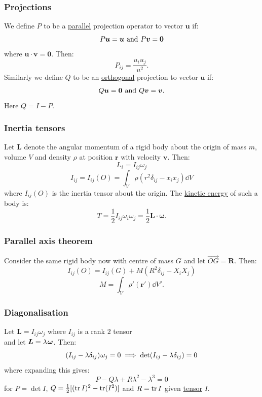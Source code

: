 \documentclass{article}
\newcommand{\vc}[1]{\boldsymbol{#1}}
\begin{document}
\begin{multicols*}{3}
\subsubsection*{Projections}
We define $P$ to be a \underline{parallel}
projection operator to vector $\boldsymbol{u}$ if:
$$P\boldsymbol{u}=\boldsymbol{u}
\hspace{0.05in}\text{and}\hspace{0.05in}
P\boldsymbol{v}=\boldsymbol{0}$$
where $\boldsymbol{u}\cdot\boldsymbol{v}=\boldsymbol{0}$.
Then:
$$P_{ij}=\frac{u_i u_j}{u^2}.$$
Similarly we define $Q$ to be an \underline{orthogonal} projection
to vector $\boldsymbol{u}$ if:
$$Q\boldsymbol{u}=\boldsymbol{0}
\hspace{0.05in}\text{and}\hspace{0.05in}
Q\boldsymbol{v}=\boldsymbol{v}.$$
Here $Q=I-P$.

\subsubsection*{Inertia tensors}
Let $\boldsymbol{L}$ denote the angular momentum of a
rigid body about the origin of mass $m$,
volume $V$ and density $\rho$
at position $\boldsymbol{r}$
with velocity $\boldsymbol{v}$. Then:
$$L_i=I_{ij}\omega_j$$
$$I_{ij}=I_{ij}(O)=\int_V\rho(r^2\delta_{ij}-x_i x_j)\dd V$$
where $I_{ij}(O)$ is the inertia tensor about
the origin.
The \underline{kinetic energy} of such a body is:
$$T=\frac{1}{2}I_{ij}\omega_i\omega_j
=\frac{1}{2}\boldsymbol{L}\cdot\boldsymbol{\omega}.$$

\subsubsection*{Parallel axis theorem}
Consider the same rigid body now
with centre of mass $G$ and let
$\overrightarrow{OG}=\boldsymbol{R}$. Then:
$$I_{ij}(O)=I_{ij}(G)+M(R^2\delta_{ij}-X_i X_j)$$
$$M=\int_V\rho'(\boldsymbol{r}')\dd V'.$$

\subsubsection*{Diagonalisation}
Let $\vc{L}=I_{ij}\omega_j$
where $I_{ij}$ is a rank $2$ tensor \\
and let $\vc{L}=\lambda\hspace{0.01in}\vc{\omega}$.
Then:
$$(I_{ij}-\lambda\delta_{ij})\hspace{0.01in}\omega_j=0
\implies\det(I_{ij}-\lambda\delta_{ij})=0$$
where expanding this gives:
$$P-Q\lambda+R\lambda^2-\lambda^3=0$$
for $P=\det I$,
$Q=\frac{1}{2}[(\trace I)^2-\trace(I^2)]$
and $R=\trace I$
given \underline{tensor} $I$.


\end{multicols*}
\end{document}
